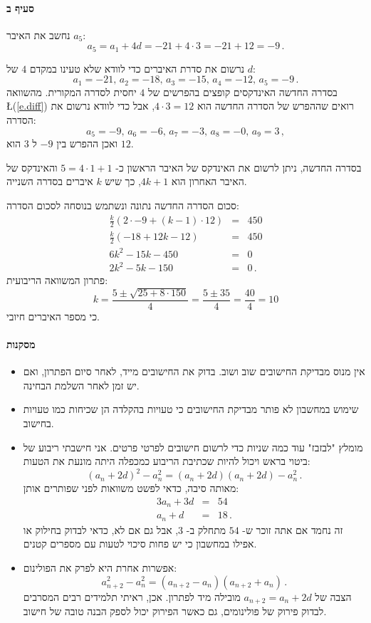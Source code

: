 \documentclass[12pt,a4paper]{article}
\begin{document}
\vspace{-4ex}\paragraph{סעיף ב}
נחשב את האיבר
$a_5$:
\begin{equation}
a_5 = a_1 + 4d = -21 + 4\cdot 3 = -21 + 12 = -9\,. \label{e.diff}
\end{equation}

נרשום את סדרת האיברים כדי לוודא שלא טעינו במקדם
$4$
של
$d$:
\[
a_1 = -21,\, a_2 = -18,\, a_3 = -15,\, a_4 = -12,\, a_5 = -9\,.
\]
בסדרה החדשה האינדקסים קופצים בהפרשים של
$4$
יחסית לסדרה המקורית. מהשוואה
\L{(\ref{e.diff})}
רואים שההפרש של הסדרה החדשה הוא
$4\cdot 3=12$,
אבל כדי לוודא נרשום את הסדרה:
\[
a_5 = -9,\, a_6 = -6,\, a_7 = -3,\, a_8 = -0,\, a_9 = 3\,,
\]
ואכן ההפרש בין
$-9$
ל
$3$
הוא 
$12$.

בסדרה החדשה, ניתן לרשום את האינדקס של האיבר הראשון כ-
$5 = 4\cdot 1+1$
והאינדקס של האיבר האחרון הוא
$4k+1$,
כך שיש 
$k$
איברים בסדרה השנייה.

סכום הסדרה החדשה נתונה ונשתמש בנוסחה לסכום הסדרה:
\begin{eqnarray*}
\frac{k}{2}(2\cdot -9 + (k-1)\cdot 12) &=& 450\\
\frac{k}{2}(-18+12k-12) &=& 450\\
6k^2 -15k - 450 &=&0\\
2k^2 -5k - 150 &=&0\,.
\end{eqnarray*}
פתרון המשוואה הריבועית:
\[
k=\frac{5\pm \sqrt{25+8\cdot 150}}{4} = \frac{5\pm 35}{4}= \frac{40}{4} = 10
\]
כי מספר האיברים חיובי.

\paragraph{מסקנות}

\begin{itemize}
\item
אין מנוס מבדיקת החישובים שוב ושוב. בדוק את החישובים מייד, לאחר סיום הפתרון, ואם יש זמן לאחר השלמת הבחינה.
\item
שימוש במחשבון לא פותר מבדיקת החישובים כי טעויות בהקלדה הן שכיחות כמו טעויות בחישוב.
\item
מומלץ "לבזבז" עוד כמה שניות כדי לרשום חישובים לפרטי פרטים. אני חישבתי ריבוע של ביטוי בראש ויכול להיות שכתיבת הריבוע כמכפלה היתה מונעת את הטעות:
\[
(a_n+2d)^2 - a_n^2 = (a_n+2d)(a_n+2d) - a_n^2\,.
\]
מאותה סיבה, כדאי לפשט משוואות לפני שפותרים אותן:
\begin{eqnarray*}
3a_n + 3d &=& 54\\
a_n + d &=& 18\,.
\end{eqnarray*}
זה נחמד אם אתה זוכר ש-
$54$
מתחלק ב-
$3$,
אבל גם אם לא, כדאי לבדוק בחילוק או אפילו במחשבון כי יש פחות סיכוי לטעות עם מספרים קטנים.

\item
אפשרות אחרת היא לפרק את הפולינום:
\[
a^2_{n+2} - a^2_n = (a_{n+2} - a_n)(a_{n+2}+a_n)\,.
\]
הצבה של
$a_{n+2}=a_n+2d$
מובילה מיד לפתרון. אכן, ראיתי תלמידים רבים המסרבים לבדוק פירוק של פולינומים, גם כאשר הפירוק יכול לספק הבנה טובה של חישוב.
\end{itemize}
\end{document}
